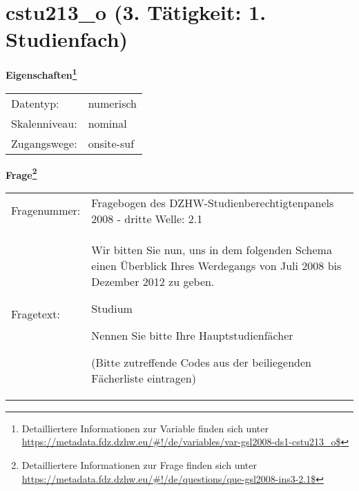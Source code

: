 
    \setcounter{footnote}{0}

    \vspace*{-1.8cm}
	\section{cstu213\_o (3. Tätigkeit: 1. Studienfach)}
	\label{section:cstu213_o}



    \vspace*{0.5cm}
    \noindent\textbf{Eigenschaften\footnote{Detailliertere Informationen zur Variable finden sich unter
		\url{https://metadata.fdz.dzhw.eu/\#!/de/variables/var-gsl2008-ds1-cstu213_o$}}}\\
	\begin{tabularx}{\hsize}{@{}lX}
	Datentyp: & numerisch \\
	Skalenniveau: & nominal \\
	Zugangswege: &
	  onsite-suf
 \\
    \end{tabularx}



				\vspace*{0.5cm}
                \noindent\textbf{Frage\footnote{Detailliertere Informationen zur Frage finden sich unter
		              \url{https://metadata.fdz.dzhw.eu/\#!/de/questions/que-gsl2008-ins3-2.1$}}}\\
				\begin{tabularx}{\hsize}{@{}lX}
					Fragenummer: &
					  Fragebogen des DZHW-Studienberechtigtenpanels 2008 - dritte Welle:
					  2.1
 \\
					Fragetext: & Wir bitten Sie nun, uns in dem folgenden Schema einen Überblick Ihres Werdegangs von Juli 2008 bis Dezember 2012 zu geben.\par  Studium\par  Nennen Sie bitte Ihre Hauptstudienfächer\par  (Bitte zutreffende Codes aus der beiliegenden Fächerliste eintragen) \\
				\end{tabularx}





